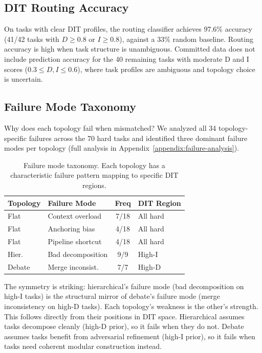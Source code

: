 \subsection{DIT Routing Accuracy}\label{dit-routing-accuracy}

On tasks with clear DIT profiles, the routing classifier achieves 97.6\% accuracy (41/42 tasks with $D \geq 0.8$ or $I \geq 0.8$), against a 33\% random baseline. Routing accuracy is high when task structure is unambiguous. Committed data does not include prediction accuracy for the 40 remaining tasks with moderate D and I scores ($0.3 \leq D, I \leq 0.6$), where task profiles are ambiguous and topology choice is uncertain.

\subsection{Failure Mode Taxonomy}\label{failure-mode-taxonomy}

Why does each topology fail when mismatched? We analyzed all 34 topology-specific failures across the 70 hard tasks and identified three dominant failure modes per topology (full analysis in Appendix~\ref{appendix:failure-analysis}).

\begin{table}[t]
\centering
\caption{Failure mode taxonomy. Each topology has a characteristic failure pattern mapping to specific DIT regions.}
\label{tab:failure_modes}
\small
\begin{tabular}{p{1.4cm}p{2.0cm}cp{1.3cm}}
\toprule
Topology & Failure Mode & Freq & DIT Region \\
\midrule
Flat & Context overload & 7/18 & All hard \\
Flat & Anchoring bias & 4/18 & All hard \\
Flat & Pipeline shortcut & 4/18 & All hard \\
Hier. & Bad decomposition & 9/9 & High-I \\
Debate & Merge inconsist. & 7/7 & High-D \\
\bottomrule
\end{tabular}
\end{table}

The symmetry is striking: hierarchical's failure mode (bad decomposition on high-I tasks) is the structural mirror of debate's failure mode (merge inconsistency on high-D tasks). Each topology's weakness is the other's strength. This follows directly from their positions in DIT space. Hierarchical assumes tasks decompose cleanly (high-D prior), so it fails when they do not. Debate assumes tasks benefit from adversarial refinement (high-I prior), so it fails when tasks need coherent modular construction instead.

